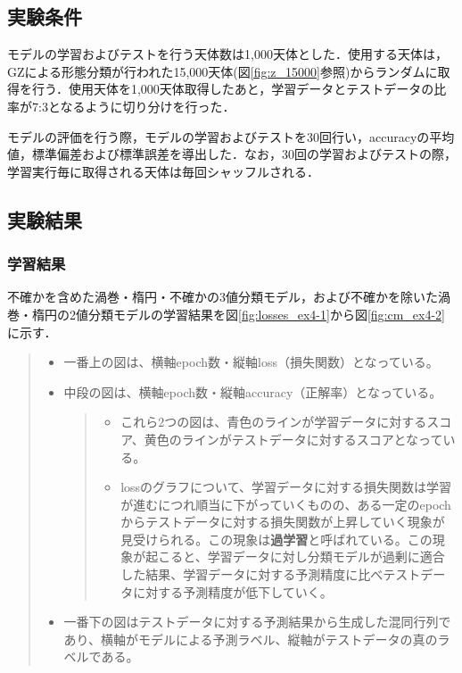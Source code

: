 \documentclass[a4j, 11pt]{jreport}
\begin{document}
\subsection{実験条件}
モデルの学習およびテストを行う天体数は1,000天体とした．使用する天体は，GZによる形態分類が行われた15,000天体(図\ref{fig:z_15000}参照)からランダムに取得を行う．使用天体を1,000天体取得したあと，学習データとテストデータの比率が7:3となるように切り分けを行った．

モデルの評価を行う際，モデルの学習およびテストを30回行い，accuracyの平均値，標準偏差および標準誤差を導出した．なお，30回の学習およびテストの際，学習実行毎に取得される天体は毎回シャッフルされる．

\subsection{実験結果}
\subsubsection{学習結果}
不確かを含めた渦巻・楕円・不確かの3値分類モデル，および不確かを除いた渦巻・楕円の2値分類モデルの学習結果を図\ref{fig:losses_ex4-1}から図\ref{fig:cm_ex4-2}に示す．

\begin{quote}
 \begin{itemize}
	\item 一番上の図は、横軸epoch数・縦軸loss（損失関数）となっている。
	\item 中段の図は、横軸epoch数・縦軸accuracy（正解率）となっている。
	\begin{quote}
	 \begin{itemize}
		\item これら2つの図は、青色のラインが学習データに対するスコア、黄色のラインがテストデータに対するスコアとなっている。
		\item lossのグラフについて、学習データに対する損失関数は学習が進むにつれ順当に下がっていくものの、ある一定のepochからテストデータに対する損失関数が上昇していく現象が見受けられる。この現象は\textbf{過学習}と呼ばれている。この現象が起こると、学習データに対し分類モデルが過剰に適合した結果、学習データに対する予測精度に比べテストデータに対する予測精度が低下していく。
	 \end{itemize}
	\end{quote}
	\item 一番下の図はテストデータに対する予測結果から生成した混同行列であり、横軸がモデルによる予測ラベル、縦軸がテストデータの真のラベルである。
 \end{itemize}
\end{quote}
\end{document}
